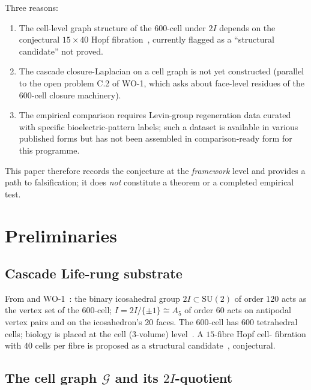 \documentclass[12pt]{article}
\begin{document}
Three reasons:
\begin{enumerate}
\item The cell-level graph structure of the 600-cell under $2I$
  depends on the conjectural $15 \times 40$ Hopf
  fibration~\cite[\S 2.6]{CascadeBio}, currently flagged as a
  ``structural candidate'' not proved.
\item The cascade closure-Laplacian on a cell graph is not yet
  constructed (parallel to the open problem C.2 of WO-1, which
  asks about face-level residues of the 600-cell closure
  machinery).
\item The empirical comparison requires Levin-group
  regeneration data curated with specific bioelectric-pattern
  labels; such a dataset is available in various published forms
  but has not been assembled in comparison-ready form for this
  programme.
\end{enumerate}
This paper therefore records the conjecture at the
\emph{framework} level and provides a path to falsification; it
does \emph{not} constitute a theorem or a completed empirical
test.

\section{Preliminaries}\label{sec:prelim}

\subsection{Cascade Life-rung substrate}

From \cite[\S 2.1--2.3]{CascadeBio} and WO-1~\cite{SmartCapsid}:
the binary icosahedral group $2I \subset \mathrm{SU}(2)$ of order
$120$ acts as the vertex set of the 600-cell; $I = 2I/\{\pm 1\}
\cong A_5$ of order $60$ acts on antipodal vertex pairs and on
the icosahedron's 20 faces. The 600-cell has $600$ tetrahedral
cells; biology is placed at the cell (3-volume)
level~\cite[\S 3.1]{CascadeBio}. A $15$-fibre Hopf cell-
fibration with $40$ cells per fibre is proposed as a structural
candidate~\cite[\S 2.6]{CascadeBio}, conjectural.

\subsection{The cell graph $\mathcal{G}$ and its $2I$-quotient}
\end{document}

